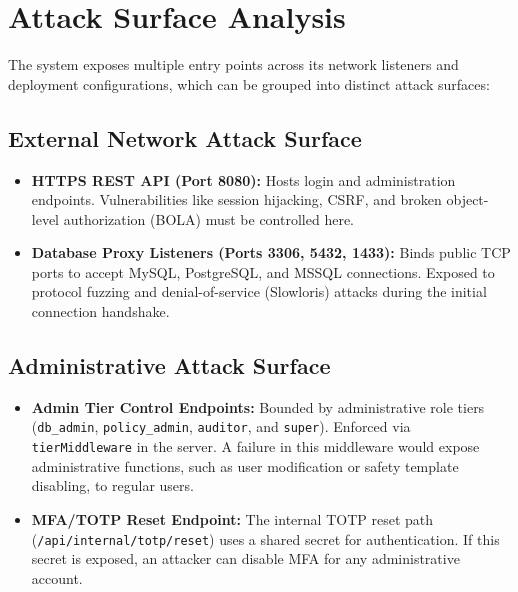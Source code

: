 \section{Attack Surface Analysis}

The system exposes multiple entry points across its network listeners and deployment configurations, which can be grouped into distinct attack surfaces:

\subsection{External Network Attack Surface}
\begin{itemize}[leftmargin=*]
    \item \textbf{HTTPS REST API (Port 8080):} Hosts login and administration endpoints. Vulnerabilities like session hijacking, CSRF, and broken object-level authorization (BOLA) must be controlled here.
    \item \textbf{Database Proxy Listeners (Ports 3306, 5432, 1433):} Binds public TCP ports to accept MySQL, PostgreSQL, and MSSQL connections. Exposed to protocol fuzzing and denial-of-service (Slowloris) attacks during the initial connection handshake.
\end{itemize}

\subsection{Administrative Attack Surface}
\begin{itemize}[leftmargin=*]
    \item \textbf{Admin Tier Control Endpoints:} Bounded by administrative role tiers (\texttt{db\_admin}, \texttt{policy\_admin}, \texttt{auditor}, and \texttt{super}). Enforced via \texttt{tierMiddleware} in the server. A failure in this middleware would expose administrative functions, such as user modification or safety template disabling, to regular users.
    \item \textbf{MFA/TOTP Reset Endpoint:} The internal TOTP reset path (\texttt{/api/internal/totp/reset}) uses a shared secret for authentication. If this secret is exposed, an attacker can disable MFA for any administrative account.
\end{itemize}

